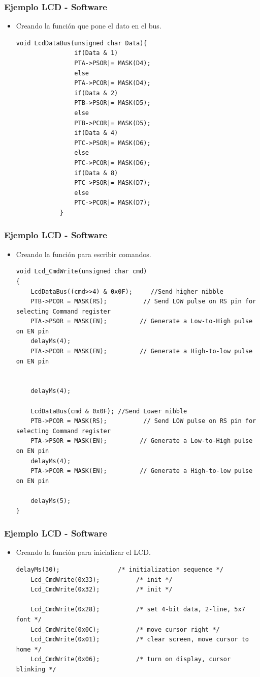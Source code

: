 \documentclass[10.5pt,scale=1.0,t,aspectratio=169,hyperref={pdfpagelabels=false}]{beamer}
\begin{document}
\begin{frame}[fragile]
	\frametitle{Ejemplo LCD - Software}
	\begin{itemize}
		\item Creando la función que pone el dato en el bus.
		\begin{lstlisting}[style=CStyle]
			void LcdDataBus(unsigned char Data){
				if(Data & 1)
				PTA->PSOR|= MASK(D4);
				else
				PTA->PCOR|= MASK(D4);
				if(Data & 2)
				PTB->PSOR|= MASK(D5);
				else
				PTB->PCOR|= MASK(D5);
				if(Data & 4)
				PTC->PSOR|= MASK(D6);
				else
				PTC->PCOR|= MASK(D6);
				if(Data & 8)
				PTC->PSOR|= MASK(D7);
				else
				PTC->PCOR|= MASK(D7);
			}
		\end{lstlisting}
	\end{itemize}	
\end{frame}
\begin{frame}[fragile]
	\frametitle{Ejemplo LCD - Software}
	\begin{itemize}
		\item Creando la función para escribir comandos.
		\begin{lstlisting}[style=CStyle]
void Lcd_CmdWrite(unsigned char cmd)
{
	LcdDataBus((cmd>>4) & 0x0F);     //Send higher nibble
	PTB->PCOR = MASK(RS);	   	   // Send LOW pulse on RS pin for selecting Command register
	PTA->PSOR = MASK(EN);	  	  // Generate a Low-to-High pulse on EN pin
	delayMs(4);
	PTA->PCOR = MASK(EN);	  	  // Generate a High-to-low pulse on EN pin
	
	
	delayMs(4);
	
	LcdDataBus(cmd & 0x0F); //Send Lower nibble
	PTB->PCOR = MASK(RS);	   	   // Send LOW pulse on RS pin for selecting Command register
	PTA->PSOR = MASK(EN);	  	  // Generate a Low-to-High pulse on EN pin
	delayMs(4);
	PTA->PCOR = MASK(EN);	  	  // Generate a High-to-low pulse on EN pin
	
	delayMs(5);
}
		\end{lstlisting}
	\end{itemize}	
\end{frame}
\begin{frame}[fragile]
	\frametitle{Ejemplo LCD - Software}
	\begin{itemize}
		\item Creando la función para inicializar el LCD.
		\begin{lstlisting}[style=CStyle]
    delayMs(30);                /* initialization sequence */
	Lcd_CmdWrite(0x33);          /* init */
	Lcd_CmdWrite(0x32);          /* init */
	
	Lcd_CmdWrite(0x28);          /* set 4-bit data, 2-line, 5x7 font */
	Lcd_CmdWrite(0x0C);          /* move cursor right */
	Lcd_CmdWrite(0x01);          /* clear screen, move cursor to home */
	Lcd_CmdWrite(0x06);          /* turn on display, cursor blinking */
		\end{lstlisting}
	\end{itemize}	
\end{frame}
\end{document}

